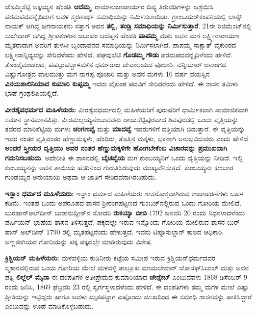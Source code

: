 ಜೊಮ್ಮಿಸೆಟ್ಟಿ ಅಕ್ಕಯ್ಯನ ಹೆಂಡತಿ \textbf{ಆದೆಮ್ಮ}, ರಾಮಾನುಜಾಚಾರ್ಯರ ದಿವ್ಯ ತಿರುವಡಿಗಳನ್ನು ಆಶ್ರಯಿಸಿ ಪರಮಪದ\-ವನ್ನೈದಿದಾಗ ಅವಳ ಸ್ಮರಣಾರ್ಥ ಸಮಾಧಿಯನ್ನು ನಿರ್ಮಿಸಲಾಯಿತು. ಗ್ರಾಂಒಯರ್​ ಕಂಪನಿಯಲ್ಲಿ ಲಾನ್ಸ್​ನಾಯಕ್​ ಆಗಿದ್ದ ಜಗನಾಯಕನು ಸತ್ತಾಗ ಅವನ \textbf{ತಲ್ಲಿ, ತಂಡ್ರಿ ಸಮಾಧಿಯನ್ನು ನಿರ್ಮಿಸುತ್ತಾರೆ}. 21ನೇ ರಿಜಿಮೆಂಟ್​ನಲ್ಲಿ ಸುಬೇದಾರ್​ ಆಗಿದ್ದ ಶ‍್ರೀಕಾಕುಳಂನ ಚಟುಕುಂ ಆದೆಪ್ಪನ ಹೆಂಡತಿ \textbf{ಪಾಪಮ್ಮ} ಮತ್ತು ಅವನ ಮಗ ಲಕ್ಷ್ಮೀನಾರಾಯಣ ಮೃತರಾದಾಗ ಅವರಿಗೆ ತುಳಸೀ ಬೃಂದಾವನದ ಸಮಾಧಿಯನ್ನು ನಿರ್ಮಿಸಲಾಗಿದೆ. ಪಾಪಮ್ಮ ಸಾಕ್ಷಾತ್​ ವೈಕುಂಠದ ಲಕ್ಷ್ಮೀಸಾನ್ನಿಧ್ಯವನ್ನು ಸೇರಿದಳೆಂದು ಹೇಳಿದೆ. ಪಘವುಲೆಟಿ \textbf{ಗೊಡಮ್ಮ ಗೌಡು} ಪರಮಪದವನ್ನೈದಿಳೆಂದು ಹೇಳಿದೆ. ತೊಂಡೈಮಂಡಲದ, ಪಷಟ್ಟುಪಟ್ಟಾಳಮ್​ನ ಧರ್ಮರಾಜ ದೇವಾಲಯದ ಪೂಜಾರಿ, ವನ್ನಿಯಾರ್​ ಜನಾಂಗದ ವಿಷ್ಣುಗೋತ್ರದ ವಾಲಮುತ್ತು ಮಗ ನಾಗಪ್ಪ ಪೂಜಾರಿ ಮತ್ತು ಅವನ ಮಗಳು 16 ವರ್ಷ ವಯಸ್ಸಿನ \textbf{ವಿನಯಶಾಲಿನಿಯಾದ ಕುಮಾರಿ ಕುಪ್ಪಮ್ಮ} ಇವರು ವೈಕುಂಠ ಪದವಿಗೆ ಸೇರಿದರೆಂದು ಹೇಳಿದೆ. ಈ ಶಾಸನ ತಮಿಳು ಭಾಷೆ ಗ್ರಂಥಲಿಪಿಯಲ್ಲಿದೆ.

\textbf{ವೀರಶೈವಧರ್ಮದ ಮಹಿಳೆಯರು: } ವೀರಶೈವಧರ್ಮದಲ್ಲಿ ಮಹಿಳೆಯರಿಗೆ ಪುರುಷರಿಗೆ ಧಾರ್ಮಿಕವಾಗಿ ಸಾಮಾಜಿಕವಾಗಿ ಸಮಾನ ಸ್ಥಾನಮಾನವಿತ್ತು. ವೀರಮಲ್ಲಯ್ಯನೆಂಬುವವನು ರಾಯಸೆಟ್ಟಿಪುರವಾದ ಶಿವಪುರದಲ್ಲಿ ಒಂದು ವೃತ್ತಿಯನ್ನು ತವರದ ಮಾರಿಸೆಟ್ಟಿಯ ಮಗಳು \textbf{ಚಂಗಣವ್ವೆ} ಮತ್ತು \textbf{ಮಾದವ್ವೆ} ಇವರುಗಳಿಗೆ ದತ್ತಿಯಾಗಿ ಬಿಡುತ್ತಾನೆ. ಈ ವೃತ್ತಿಯನ್ನು ಇವರ ನಂತರ ವೃತ್ತಿವಂತರ ಹೆಣ್ಣುಮಕ್ಕಳು, ಹೆಂಡಿರು, ತೊತ್ತಿನ ಮಕ್ಕಳು, ಭಕ್ತರಾಗಿ ಅನುಭವಿಸುವರು ಎಂದು ಹೇಳಿದೆ. \textbf{ಅಂದರೆ ಸ್ತ್ರೀಯರ ವೃತ್ತಿಯು ಅವರ ನಂತರ ಹೆಣ್ಣುಮಕ್ಕಳಿಗೇ ಹೋಗಬೇಕೆಂಬ ವಿಚಾರವನ್ನು ಪ್ರಮುಖವಾಗಿ ಗಮನಿಸಬಹುದು}. ಅದೇರೀತಿ ಈ ಶಾಸನದಲ್ಲಿ \textbf{ಬೈಚವ್ವೆಯ} ಮಗ ಕುಂಬಯ್ಯನಿಗೆ ಒಂದು ವೃತ್ತಿಯನ್ನು ನೀಡಿದೆ. ಇಲ್ಲಿ ಕುಂಬಯ್ಯನನ್ನು ಅವನ ತಾಯಿಯ ಹೆಸರಿನಿಂದ ಗುರುತಿಸಿರುವುದು ಮುಖ್ಯವೆನಿಸುತ್ತದೆ. ಕುಂಬಯ್ಯನು ಕುಂಬಾರ ಗುಂಡಯ್ಯನ ಅನುಯಾಯಿ ಅಥವಾ ಆ ಜಾತಿಗೆ ಸೇರಿದವನಾಗಿರಬಹುದು.

\textbf{ಇಸ್ಲಾಂ ಧರ್ಮದ ಮಹಿಳೆಯರು: } ಇಸ್ಲಾಂ ಧರ್ಮದ ಮಹಿಳೆಯರು ಶಾಸನೋಕ್ತವಾಗಿರುವ ಉದಾಹರಣೆಗಳು ಬಹಳ ಕಡಿಮೆ. ಇಂತಹ ಒಂದು ಅಪರೂಪದ ಶಾಸನ ಶ‍್ರೀರಂಗಪಟ್ಟಣದ ಗುಂಬಜ್​ನಲ್ಲಿರುವ ಒಂದು ಗೋರಿಯ ಮೇಲಿದೆ. ಬುರಹಾನ್​ಅಲ್​ದೀನ್​ ಬುರಾನುದ್ದೀನ್​ನ ಸೋದರಿ \textbf{ರುಕಯ್ಯಾ ಬೀಬಿ} 1792 ಜನವರಿ 20 ರಂದು ನಿಧನಳಾದಳೆಂದು ಪರ್ಷಿಯನ್​ ಭಾಷೆಯ ಶಾಸನ ತಿಳಿಸುತ್ತದೆ. ಪಕ್ಕದಲ್ಲೇ ಇರುವ ಇನ್ನೊಂದು ಗೋರಿಯ ಮೇಲಿರುವ ಶಾಸನ ಬುರ್​ಹಾನ್​ ಅಲ್​ದೀನ್​ 1790 ರಲ್ಲಿ ಮೃತಪಟ್ಟನೆಂದು ಹೇಳುತ್ತದೆ. ಇವನು ಟಿಪ್ಪೂಸುಲ್ತಾನ್​ ಕಾಲದ ಆಧಿಕಾರಿ. ಅಣ್ಣತಂಗಿಯರ ಗೋರಿಯನ್ನು ಪಕ್ಕ ಪಕ್ಕದಲ್ಲೇ ಮಾಡಿರುವುದು ವಿಶೇಷ.

\textbf{ಕ್ರಿಶ್ಚಿಯನ್​ ಮಹಿಳೆಯರು: } ಮಳವಳ್ಳಿಯ ಕುಡಿನೀರು ಕಟ್ಟೆಯ ಸಮೀಪ ಇರುವ ಕ್ರಿಶ್ಚಿಯನ್​ ಧರ್ಮದವರ ಸ್ಮಶಾನದಲ್ಲಿರುವ ಒಂದು ಗೋರಿಯ ಮೇಲೆ ಮಳವಳ್ಳಿ ತಾಲ್ಲೂಕು ಮಾಮಲೇದಾರ್​ ಜೋಸೆಫ್​ಸಿಬಾಲ್​ ಮತ್ತು ಅವನ ಪತ್ನಿ \textbf{ಲಿಲ್ಲೆಲ್​ ಮೈನಾ} ಈ ದಂಪತಿಗಳ ಅತೀಪ್ರೇಮದ ಕುಮಾರಿಯಾದ \textbf{ಜೇನ್ನೇಬ್}​ ಎಂಬುವವಳು 1868 ಡಿಸೆಂಬರ್​ 9 ರಂದು ಜನಿಸಿ, 1869 ಫೆಬ್ರವರಿ 23 ರಲ್ಲಿ ಸ್ವರ್ಗಸ್ಥಳಾದಳೆಂದು ಹೇಳಿದೆ. ಈ ದಂಪತಿಗಳು ತಮ್ಮ ಮಗಳ ಮೇಲೆ ಎಷ್ಟು ಪ್ರೀತಿಯನ್ನು ಇಟ್ಟಿದ್ದರು ಹಾಗೂ ಅವಳು ಮೃತಪಟ್ಟಾಗ ಎಷ್ಟೊಂದು ದುಃಖದಿಂದ ಈ ಸಮಾಧಿ ಶಾಸನವನ್ನು ಹಾಕಿಸಿದ್ದಾರೆ ಎಂಬುದನ್ನು ಊಹೆ ಮಾಡಿಕೊಳ್ಳಬಹುದು.

